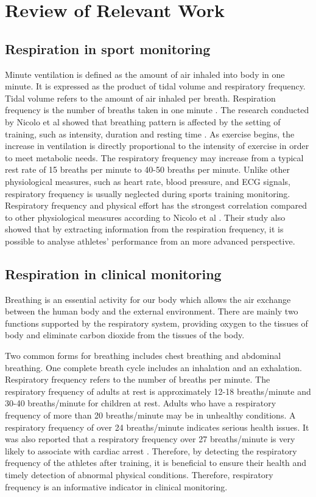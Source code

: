 \chapter{Review of Relevant Work}

\section{Respiration in sport monitoring}
Minute ventilation is defined as the amount of air inhaled into body in one minute. It is expressed as the product of tidal volume and respiratory frequency. Tidal volume refers to the amount of air inhaled per breath. Respiration frequency is the number of breaths taken in one minute \cite{Zuurbier2009MinuteStudy}. The research conducted by Nicolo et al showed that breathing pattern is affected by the setting of training, such as intensity, duration and resting time \cite{Nicolo2018RespiratoryInterdependence}. As exercise begins, the increase in ventilation is directly proportional to the intensity of exercise in order to meet metabolic needs. The respiratory frequency may increase from a typical rest rate of 15 breaths per minute to 40-50 breaths per minute. Unlike other physiological measures, such as heart rate, blood pressure, and ECG signals, respiratory frequency is usually neglected during sports training monitoring. Respiratory frequency and physical effort has the strongest correlation compared to other physiological measures according to Nicolo et al \cite{Nicolo2017RespiratoryMeasure}. Their study also showed that by extracting information from the respiration frequency, it is possible to analyse athletes' performance from an more advanced perspective.

\section{Respiration in clinical monitoring}
Breathing is an essential activity for our body which allows the air exchange between the human body and the external environment. There are mainly two functions supported by the respiratory system, providing oxygen to the tissues of body and eliminate carbon dioxide from the tissues of the body. 

Two common forms for breathing includes chest breathing and abdominal breathing. One complete breath cycle includes an inhalation and an exhalation. Respiratory frequency refers to the number of breaths per minute. The respiratory frequency of adults at rest is approximately 12-18 breaths/minute and 30-40 breaths/minute for children at rest. Adults who have a respiratory frequency of more than 20 breaths/minute may be in unhealthy conditions. A respiratory frequency of over 24 breaths/minute indicates serious health issues. It was also reported that a respiratory frequency over 27 breaths/minute is very likely to associate with cardiac arrest \cite{Cretikos2008OfMBA}.  Therefore, by detecting the respiratory frequency of the athletes after training, it is beneficial to ensure their health and timely detection of abnormal physical conditions. Therefore, respiratory frequency is an informative indicator in clinical monitoring.

